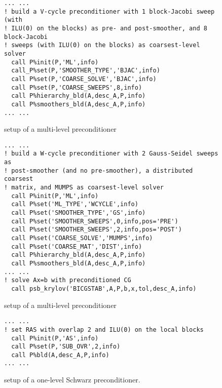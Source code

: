 \begin{figure}[tbh]
\begin{center}
\begin{minipage}{.90\textwidth} 
{\small
\begin{verbatim}
... ...
! build a V-cycle preconditioner with 1 block-Jacobi sweep (with 
! ILU(0) on the blocks) as pre- and post-smoother, and 8  block-Jacobi
! sweeps (with ILU(0) on the blocks) as coarsest-level solver
  call P%init(P,'ML',info)
  call_P%set(P,'SMOOTHER_TYPE','BJAC',info)
  call P%set(P,'COARSE_SOLVE','BJAC',info)
  call P%set(P,'COARSE_SWEEPS',8,info)
  call P%hierarchy_bld(A,desc_A,P,info)
  call P%smoothers_bld(A,desc_A,P,info)
... ...
\end{verbatim}
}
\end{minipage}

\caption{setup of a multi-level preconditioner\label{fig:ex2}}
\end{center}
\end{figure}

\begin{figure}[h!]
\begin{center}
\begin{minipage}{.90\textwidth} 
{\small
\begin{verbatim}
... ...
! build a W-cycle preconditioner with 2 Gauss-Seidel sweeps as 
! post-smoother (and no pre-smoother), a distributed coarsest
! matrix, and MUMPS as coarsest-level solver
  call P%init(P,'ML',info)
  call P%set('ML_TYPE','WCYCLE',info)
  call P%set('SMOOTHER_TYPE','GS',info)
  call P%set('SMOOTHER_SWEEPS',0,info,pos='PRE')
  call P%set('SMOOTHER_SWEEPS',2,info,pos='POST')
  call P%set('COARSE_SOLVE','MUMPS',info)
  call P%set('COARSE_MAT','DIST',info)
  call P%hierarchy_bld(A,desc_A,P,info)
  call P%smoothers_bld(A,desc_A,P,info)
... ...
! solve Ax=b with preconditioned CG
  call psb_krylov('BICGSTAB',A,P,b,x,tol,desc_A,info)
\end{verbatim}
}
\end{minipage}
\caption{setup of a multi-level preconditioner\label{fig:ex3}}
\end{center}
\end{figure}

\begin{figure}[h!]
\begin{center}
\begin{minipage}{.90\textwidth} 
{\small
\begin{verbatim}
... ...
! set RAS with overlap 2 and ILU(0) on the local blocks
  call P%init(P,'AS',info)
  call P%set(P,'SUB_OVR',2,info)
  call P%bld(A,desc_A,P,info)
... ...
\end{verbatim}
}
\end{minipage}
\caption{setup of a one-level Schwarz preconditioner.\label{fig:ex4}}
\end{center}
\end{figure}


